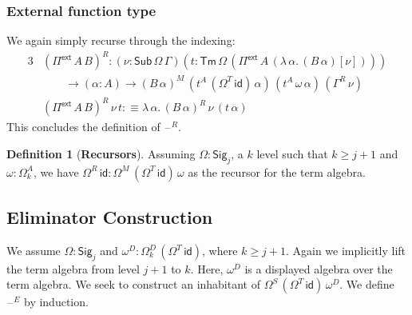 \documentclass[12pt,a4paper,twoside,openany]{book}
\theoremstyle{remark}
\theoremstyle{definition}
\newtheorem{mydefinition}{Definition}
\theoremstyle{theorem}
\newcommand{\id}{\mathsf{id}}
\newcommand{\Sub}{\mathsf{Sub}}
\newcommand{\Tm}{\mathsf{Tm}}
\newcommand{\blank}{\mathord{\hspace{1pt}\text{--}\hspace{1pt}}}
\newcommand{\Pie}{\Pi^{\mathsf{ext}}}
\newcommand{\Sig}{\mathsf{Sig}}
\newcommand{\defn}{:\equiv}
\begin{document}
\subsubsection{External function type}
We again simply recurse through the indexing:
\begin{alignat*}{3}
  & (\Pie\,A\,B)^R : (\nu : \Sub\,\Omega\,\Gamma)(t : \Tm\,\Omega\,(\Pie\,A\,(\lambda\,\alpha.\,(B\,\alpha)[\nu])))\\
  & \hspace{2em}\to (\alpha : A) \to (B\,\alpha)^M\,(t^A\,(\Omega^T\,\id)\,\alpha)\,(t^A\,\omega\,\alpha)\,(\Gamma^R\,\nu)\\
  &(\Pie\,A\,B)^R\,\nu\,t \defn \lambda\,\alpha.\,(B\,\alpha)^R\,\nu\,(t\,\alpha)
\end{alignat*}
This concludes the definition of $\blank^R$.

\begin{mydefinition}[\textbf{Recursors}]
Assuming $\Omega : \Sig_j$, a $k$ level such that $k \geq j + 1$ and $\omega :
\Omega^A_{k}$, we have $\Omega^R\,\id : \Omega^M\,(\Omega^T\,\id)\,\omega$ as
the recursor for the term algebra.
\end{mydefinition}

\subsection{Eliminator Construction}
\label{sec:fqii-eliminator-construction}

We assume $\Omega : \Sig_j$ and $\omega^D : \Omega^D_{k}\,(\Omega^T\,\id)$,
where $k \geq j + 1$. Again we implicitly lift the term algebra from level $j+1$
to $k$. Here, $\omega^D$ is a displayed algebra over the term algebra. We seek
to construct an inhabitant of $\Omega^S\,(\Omega^T\,\id)\,\omega^D$. We define
$\blank^E$ by induction.
\end{document}
